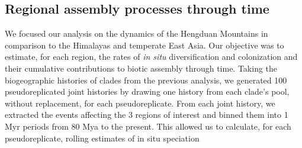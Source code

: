 \subsection{Regional assembly processes through time}

We focused our analysis on the dynamics of the Hengduan Mountains in comparison to the Himalayas and temperate East Asia. Our objective was to estimate, for each region, the rates of \textit{in situ} diversification and colonization and their cumulative contributions to biotic assembly through time. Taking the biogeographic histories of clades from the previous analysis, we generated 100 pseudoreplicated joint histories by drawing one history from each clade's pool, without replacement, for each pseudoreplicate. From each joint history, we extracted the events affecting the 3 regions of interest and binned them into 1 Myr periods from 80 Mya to the present. This allowed us to calculate, for each pseudoreplicate, rolling estimates of in situ speciation 